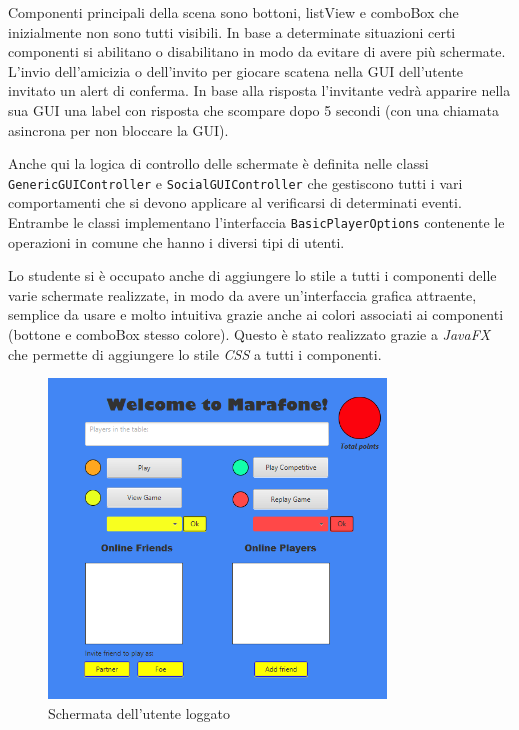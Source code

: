 Componenti principali della scena sono bottoni, listView e comboBox che inizialmente non sono tutti visibili. In base a determinate situazioni certi componenti si abilitano o disabilitano in modo da evitare di avere più schermate. 
L’invio dell’amicizia o dell’invito per giocare scatena nella GUI dell’utente invitato un alert di conferma. In base alla risposta l’invitante vedrà apparire nella sua GUI una label con risposta che scompare dopo 5 secondi (con una chiamata asincrona per non bloccare la GUI).

Anche qui la logica di controllo delle schermate è definita nelle classi \texttt{GenericGUIController} e \texttt{SocialGUIController} che gestiscono tutti i vari comportamenti che si devono applicare al verificarsi di determinati eventi. Entrambe le classi implementano l’interfaccia \texttt{BasicPlayerOptions} contenente le operazioni in comune che hanno i diversi tipi di utenti.

Lo studente si è occupato anche di aggiungere lo stile a tutti i componenti delle varie schermate realizzate, in modo da avere un’interfaccia grafica attraente, semplice da usare e molto intuitiva grazie anche ai colori associati ai componenti (bottone e comboBox stesso colore). Questo è stato realizzato grazie a \textit{JavaFX} che permette di aggiungere lo stile \textit{CSS} a tutti i componenti.

\begin{figure}[h!]
 \centering
  \includegraphics[width=0.8\textwidth]{social.png}
   \caption{Schermata dell'utente loggato }
\end{figure}

